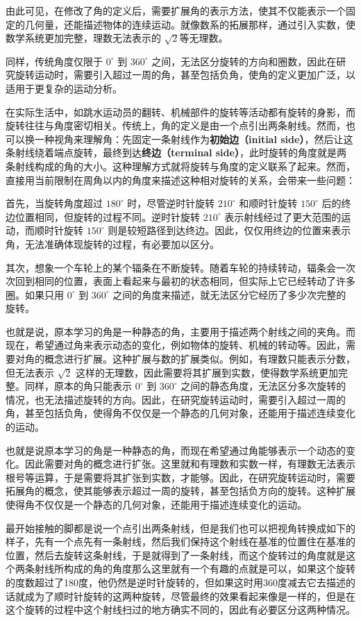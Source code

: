 由此可见，在修改了角的定义后，需要扩展角的表示方法，使其不仅能表示一个固定的几何量，还能描述物体的连续运动。就像数系的拓展那样，通过引入实数，使数学系统更加完整，理数无法表示的 $\sqrt{2}$等无理数。


同样，传统角度仅限于 $0^\circ$ 到 $360^\circ$ 之间，无法区分旋转的方向和圈数，因此在研究旋转运动时，需要引入超过一周的角，甚至包括负角，使角的定义更加广泛，以适用于更复杂的运动分析。



在实际生活中，如跳水运动员的翻转、机械部件的旋转等活动都有旋转的身影，而旋转往往与角度密切相关。传统上，角的定义是由一个点引出两条射线。然而，也可以换一种视角来理解角：先固定一条射线作为\textbf{初始边（initial side）}，然后让这条射线绕着端点旋转，最终到达\textbf{终边（terminal side）}，此时旋转的角度就是两条射线构成的角的大小。这种理解方式就将旋转与角度的定义联系了起来。然而，直接用当前限制在周角以内的角度来描述这种相对旋转的关系，会带来一些问题：

首先，当旋转角度超过 $180^\circ$ 时，尽管逆时针旋转 $210^\circ$ 和顺时针旋转 $150^\circ$ 后的终边位置相同，但旋转的过程不同。逆时针旋转 $210^\circ$ 表示射线经过了更大范围的运动，而顺时针旋转 $150^\circ$ 则是较短路径到达终边。因此，仅仅用终边的位置来表示角，无法准确体现旋转的过程，有必要加以区分。

其次，想象一个车轮上的某个辐条在不断旋转。随着车轮的持续转动，辐条会一次次回到相同的位置，表面上看起来与最初的状态相同，但实际上它已经转动了许多圈。如果只用 $0^\circ$ 到 $360^\circ$ 之间的角度来描述，就无法区分它经历了多少次完整的旋转。

也就是说，原本学习的角是一种静态的角，主要用于描述两个射线之间的夹角。而现在，希望通过角来表示动态的变化，例如物体的旋转、机械的转动等。因此，需要对角的概念进行扩展。这种扩展与数的扩展类似。例如，有理数只能表示分数，但无法表示 $\sqrt{2}$ 这样的无理数，因此需要将其扩展到实数，使得数学系统更加完整。同样，原本的角只能表示 $0^\circ$ 到 $360^\circ$ 之间的静态角度，无法区分多次旋转的情况，也无法描述旋转的方向。因此，在研究旋转运动时，需要引入超过一周的角，甚至包括负角，使得角不仅仅是一个静态的几何对象，还能用于描述连续变化的运动。


也就是说原本学习的角是一种静态的角，而现在希望通过角能够表示一个动态的变化。因此需要对角的概念进行扩张。这里就和有理数和实数一样，有理数无法表示根号等运算，于是需要将其扩张到实数，才能够。因此，在研究旋转运动时，需要拓展角的概念，使其能够表示超过一周的旋转，甚至包括负方向的旋转。这种扩展使得角不仅仅是一个静态的几何对象，还能用于描述连续变化的运动。


最开始接触的脚都是说一个点引出两条射线，但是我们也可以把视角转换成如下的样子，先有一个点先有一条射线，然后我们保持这个射线在基准的位置住在基准的位置，然后去旋转这条射线，于是就得到了一条射线，而这个旋转过的角度就是这个两条射线所构成的角的角度那么这里就有一个有趣的点就是可以，如果这个旋转的度数超过了180度，他仍然是逆时针旋转的，但如果这时用360度减去它去描述的话就成为了顺时针旋转的这两种旋转，尽管最终的效果看起来像是一样的，但是在这个旋转的过程中这个射线扫过的地方确实不同的，因此有必要区分这两种情况。

